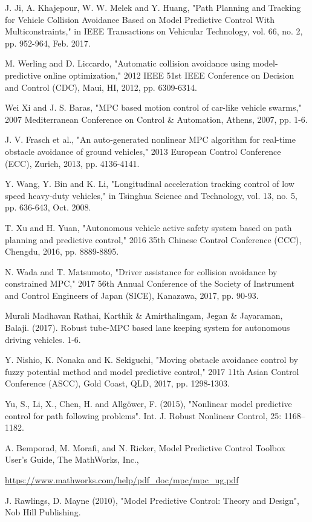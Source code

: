 \documentclass[conference, 11pt]{IEEEtran}
\begin{document}
\begin{thebibliography}{00}
	J. Ji, A. Khajepour, W. W. Melek and Y. Huang, "Path Planning and Tracking for Vehicle Collision Avoidance Based on Model Predictive Control With Multiconstraints," in IEEE Transactions on Vehicular Technology, vol. 66, no. 2, pp. 952-964, Feb. 2017.
	
	M. Werling and D. Liccardo, "Automatic collision avoidance using model-predictive online optimization," 2012 IEEE 51st IEEE Conference on Decision and Control (CDC), Maui, HI, 2012, pp. 6309-6314.
	
	Wei Xi and J. S. Baras, "MPC based motion control of car-like vehicle swarms," 2007 Mediterranean Conference on Control \& Automation, Athens, 2007, pp. 1-6.
	
	J. V. Frasch et al., "An auto-generated nonlinear MPC algorithm for real-time obstacle avoidance of ground vehicles," 2013 European Control Conference (ECC), Zurich, 2013, pp. 4136-4141.
	
	Y. Wang, Y. Bin and K. Li, "Longitudinal acceleration tracking control of low speed heavy-duty vehicles," in Tsinghua Science and Technology, vol. 13, no. 5, pp. 636-643, Oct. 2008.
	
	T. Xu and H. Yuan, "Autonomous vehicle active safety system based on path planning and predictive control," 2016 35th Chinese Control Conference (CCC), Chengdu, 2016, pp. 8889-8895.
	
	N. Wada and T. Matsumoto, "Driver assistance for collision avoidance by constrained MPC," 2017 56th Annual Conference of the Society of Instrument and Control Engineers of Japan (SICE), Kanazawa, 2017, pp. 90-93.
	
	Murali Madhavan Rathai, Karthik \& Amirthalingam, Jegan \& Jayaraman, Balaji. (2017). Robust tube-MPC based lane keeping system for autonomous driving vehicles. 1-6.
	
	Y. Nishio, K. Nonaka and K. Sekiguchi, "Moving obstacle avoidance control by fuzzy potential method and model predictive control," 2017 11th Asian Control Conference (ASCC), Gold Coast, QLD, 2017, pp. 1298-1303.
	
	Yu, S., Li, X., Chen, H. and Allgöwer, F. (2015), "Nonlinear model predictive control for path following problems". Int. J. Robust Nonlinear Control, 25: 1168–1182. 
	
	A. Bemporad, M. Morafi, and N. Ricker, Model Predictive Control Toolbox User’s Guide, The MathWorks, Inc.,
	
		\url{https://www.mathworks.com/help/pdf_doc/mpc/mpc_ug.pdf}
		
	J. Rawlings, D. Mayne (2010), "Model Predictive Control: Theory and Design", Nob Hill Publishing.	
\end{thebibliography}
\end{document}
